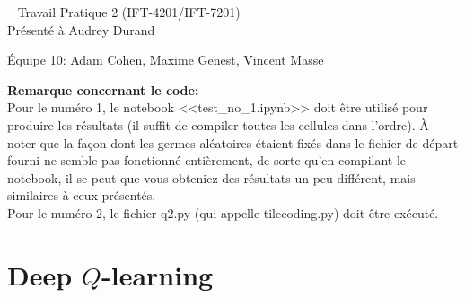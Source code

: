 \documentclass[letterpaper,11pt]{article}
\begin{document}
\begin{center}
~
\vfill
\LARGE{Travail Pratique 2 (IFT-4201/IFT-7201)}\\[0.4cm]

\Large{Présenté à Audrey Durand}

\vfill
\large{Équipe 10: Adam Cohen, Maxime Genest, Vincent Masse}

\vfill
\thispagestyle{empty}

\end{center}

\clearpage

\pagestyle{fancy}

\textbf{Remarque concernant le code:}\\

Pour le numéro 1, le notebook <<test\_no\_1.ipynb>> doit être utilisé pour produire les résultats (il suffit de compiler toutes les cellules dans l'ordre). À noter que la façon dont les germes aléatoires étaient fixés dans le fichier de départ fourni ne semble pas fonctionné entièrement, de sorte qu'en compilant le notebook, il se peut que vous obteniez des résultats un peu différent, mais similaires à ceux présentés.\\

Pour le numéro 2, le fichier q2.py (qui appelle tilecoding.py) doit être exécuté.

\clearpage

\section{Deep $Q$-learning}
\end{document}
